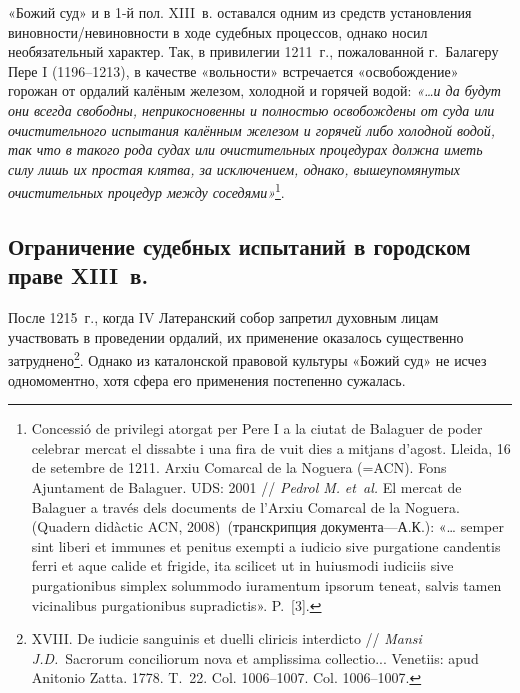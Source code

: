 «Божий суд» и в 1-й пол. XIII~в. оставался одним из средств установления виновности/невиновности в ходе судебных процессов, однако носил необязательный характер. Так, в привилегии 1211~г., пожалованной г.~Балагеру Пере I (1196--1213), в качестве «вольности» встречается «освобождение» горожан от ордалий калёным железом, холодной и горячей водой: \emph{«…и да будут они всегда свободны, неприкосновенны и полностью освобождены от суда или очистительного испытания калённым железом и горячей либо холодной водой, так что в такого рода судах или очистительных процедурах должна иметь силу лишь их простая клятва, за }\emph{исключением, однако, вышеупомянутых очистительных процедур между соседями»}\footnote{Concessió de privilegi atorgat per Pere I a la ciutat de Balaguer de poder celebrar mercat el dissabte i una fira de vuit dies a mitjans d’agost. Lleida, 16 de setembre de 1211. Arxiu Comarcal de la Noguera (=ACN). Fons Ajuntament de Balaguer. UDS: 2001 // \emph{Pedrol M. }\emph{e}\emph{t}\emph{~}\emph{al. }El mercat de Balaguer a través dels documents de l’Arxiu Comarcal de la Noguera. (Quadern didàctic ACN, 2008)~(транскрипция документа---А.К.): «… semper sint liberi et immunes et penitus exempti a iudicio sive purgatione candentis ferri et aque calide et frigide, ita scilicet ut in huiusmodi iudiciis sive purgationibus simplex solummodo iuramentum ipsorum teneat, salvis tamen vicinalibus purgationibus supradictis». P.~[3].}.

\subsection{Ограничение судебных испытаний в городском праве XIII~в.}

После 1215~г., когда IV Латеранский собор запретил духовным лицам участвовать в проведении ордалий, их применение оказалось существенно затруднено\footnote{XVIII. De iudicie sanguinis et duelli cliricis interdicto // \emph{Mansi J.D.}~Sacrorum conciliorum nova et amplissima collectio... Venetiis: apud Anitonio Zatta. 1778. T.~22. Col. 1006--1007. Col. 1006--1007.}. Однако из каталонской правовой культуры «Божий суд» не исчез одномоментно, хотя сфера его применения постепенно сужалась.

